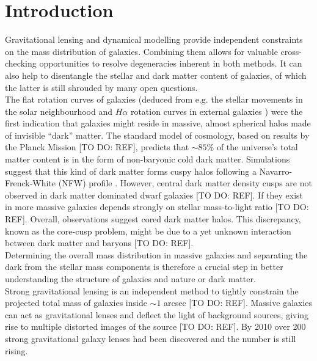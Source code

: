 \section{Introduction}

Gravitational lensing and dynamical modelling provide independent constraints on the mass distribution of galaxies. Combining them allows for valuable cross-checking opportunities to resolve degeneracies inherent in both methods. It can also help to disentangle the stellar and dark matter content of galaxies, of which the latter is still shrouded by many open questions.\\

The flat rotation curves of galaxies (deduced from e.g. the stellar movements in the solar neighbourhood \citep{1932BAN.....6..249O} and $H\alpha$ rotation curves in external galaxies \citep{1978ApJ...225L.107R}) were the first indication that galaxies might reside in massive, almost spherical halos made of invisible ``dark'' matter. The standard model of cosmology, based on results by the Planck Mission [TO DO: REF], predicts that $\sim 85\%$ of the universe's total matter content is in the form of non-baryonic cold dark matter. Simulations suggest that this kind of dark matter forms cuspy halos following a Navarro-Frenck-White (NFW) profile \citep{NFW96}. However, central dark matter density cusps are not observed in dark matter dominated dwarf galaxies [TO DO: REF]. If they exist in more massive galaxies depends strongly on stellar mass-to-light ratio [TO DO: REF]. Overall, observations suggest cored dark matter halos. This discrepancy, known as the core-cusp problem, might be due to a yet unknown interaction between dark matter and baryons [TO DO: REF].\\

Determining the overall mass distribution in massive galaxies and separating the dark from the stellar mass components is therefore a crucial step in better understanding the structure of galaxies and nature or dark matter.\\

Strong gravitational lensing is an independent method to tightly constrain the projected total mass of galaxies inside $\sim 1$ arcsec [TO DO: REF]. Massive galaxies can act as gravitational lenses and deflect the light of background sources, giving rise to multiple distorted images of the source [TO DO: REF]. By 2010 over 200 strong gravitational galaxy lenses had been discovered \citep{2010ARA&A..48...87T} and the number is still rising.\\


